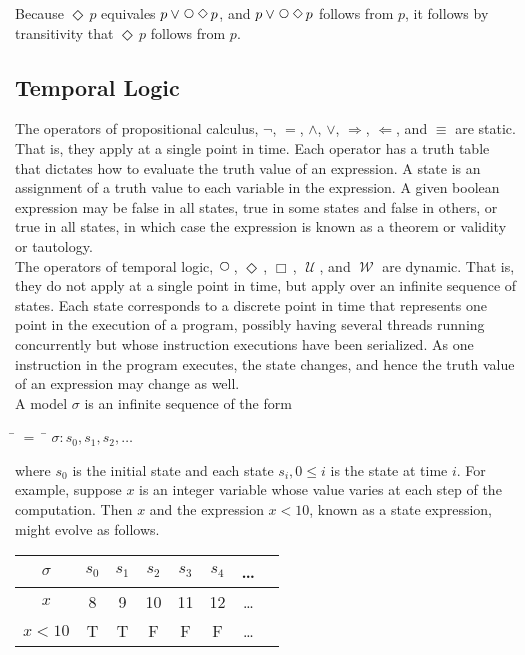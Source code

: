 \documentclass[fleqn, leqno]{article}
\newcommand{\mymathindent}{24pt}                    %
\newcommand{\impl}{\ensuremath{\Rightarrow}}        %
\newcommand{\foll}{\ensuremath{\Leftarrow}}         %
\newcommand{\Until}{\;\mathcal{U}\;}
\newcommand{\Wait}{\;\mathcal{W}\;}
\newcommand{\Next}{\;\,\text{\raisebox{3.5pt}{\circle{6}}}}
\newcommand{\Event}{\Diamond\,}
\newcommand{\Always}{\Box\,}
\begin{document}
Because $\Event p$ equivales $p \lor \Next\Event p$, and $p \lor \Next\Event p$ follows from $p$, it follows by
transitivity that $\Event p$ follows from $p$. 

\subsection{Temporal Logic}

The operators of propositional calculus, $\neg$, $=$, $\land$, $\lor$, $\impl$, $\foll$, and $\equiv$ are static.
That is, they apply at a single point in time.
Each operator has a truth table that dictates how to evaluate the truth value of an expression.
A state is an assignment of a truth value to each variable in the expression.
A given boolean expression may be false in all states, true in some states and false in others, or true in all states, in which case the expression is known as a theorem or validity or tautology.\\

The operators of temporal logic, $\Next$, $\Event$, $\Always$, $\Until$, and $\Wait$ are dynamic.
That is, they do not apply at a single point in time, but apply over an infinite sequence of states.
Each state corresponds to a discrete point in time that represents one point in the execution of a program,
possibly having several threads running concurrently but whose instruction executions have been serialized.
As one instruction in the program executes, the state changes, and hence the truth value of an expression may change as well.\\

A model $\sigma$ is an infinite sequence of the form

\begin{tabbing}
\hspace{\mymathindent} \= $= \;$ \= \kill
  \> $\sigma: s_0, s_1, s_2, \dots$
\end{tabbing}

where $s_0$ is the initial state and each state $s_i, 0 \le i$ is the state at time $i$.
For example, suppose $x$ is an integer variable whose value varies at each step of the computation.
Then $x$ and the expression $x < 10$, known as a state expression, might evolve as follows.\\

\begin{tabular}{c|ccccccc}
  $\sigma$   & $s_0$ & $s_1$ & $s_2$ & $s_3$ & $s_4$ & \dots \\
  \hline
  $x$        & 8     & 9     & 10    & 11    & 12    & \dots\\
  $x<10$     & T     & T     & F     & F     & F     & \dots
\end{tabular}\\
\end{document}
